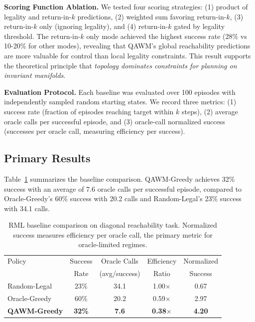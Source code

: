 \textbf{Scoring Function Ablation.} We tested four scoring strategies: (1) product of legality and return-in-$k$ predictions, (2) weighted sum favoring return-in-$k$, (3) return-in-$k$ only (ignoring legality), and (4) return-in-$k$ gated by legality threshold. The return-in-$k$ only mode achieved the highest success rate (28\% vs 10-20\% for other modes), revealing that QAWM's global reachability predictions are more valuable for control than local legality constraints. This result supports the theoretical principle that \textit{topology dominates constraints for planning on invariant manifolds}.

\textbf{Evaluation Protocol.} Each baseline was evaluated over 100 episodes with independently sampled random starting states. We record three metrics: (1) success rate (fraction of episodes reaching target within $k$ steps), (2) average oracle calls per successful episode, and (3) oracle-call normalized success (successes per oracle call, measuring efficiency per success).

\subsection{Primary Results}

Table~\ref{tab:rml_baselines} summarizes the baseline comparison. QAWM-Greedy achieves 32\% success with an average of 7.6 oracle calls per successful episode, compared to Oracle-Greedy's 60\% success with 20.2 calls and Random-Legal's 23\% success with 34.1 calls.

\begin{table}[h]
\centering
\caption{RML baseline comparison on diagonal reachability task. Normalized success measures efficiency per oracle call, the primary metric for oracle-limited regimes.}
\label{tab:rml_baselines}
\begin{tabular}{lcccc}
\toprule
Policy & Success & Oracle Calls & Efficiency & Normalized \\
       & Rate    & (avg/success) & Ratio     & Success    \\
\midrule
Random-Legal    & 23\% & 34.1 & 1.00$\times$ & 0.67 \\
Oracle-Greedy   & 60\% & 20.2 & 0.59$\times$ & 2.97 \\
\textbf{QAWM-Greedy} & \textbf{32\%} & \textbf{7.6} & \textbf{0.38}$\times$ & \textbf{4.20} \\
\bottomrule
\end{tabular}
\end{table}

